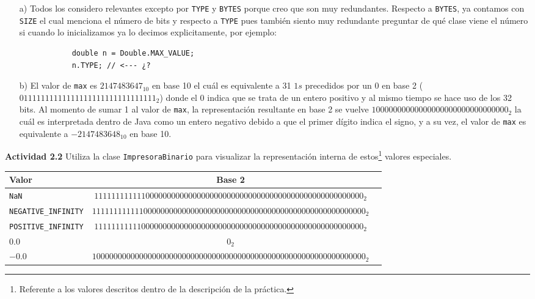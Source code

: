 \documentclass[11pt,letterpaper]{article}
\begin{document}
\begin{enumerate}
    \item[a)] Todos los considero relevantes excepto por \texttt{TYPE} y \texttt{BYTES}
    porque creo que son muy redundantes. Respecto a \texttt{BYTES}, ya contamos con
    \texttt{SIZE} el cual menciona el número de bits y respecto a \texttt{TYPE} pues
    también siento muy redundante preguntar de qué clase viene el número si cuando
    lo inicializamos ya lo decimos explicitamente, por ejemplo:
        \begin{verbatim}
            double n = Double.MAX_VALUE;
            n.TYPE; // <--- ¿?
        \end{verbatim}

    \item[b)] El valor de \texttt{max} es $2147483647_{10}$ en base 10 el cuál es equivalente
    a 31 $1s$ precedidos por un $0$ en base 2 ($01111111111111111111111111111111_2$)
    donde el $0$ indica que se trata de un entero positivo y al mismo tiempo se hace uso
    de los 32 bits. Al momento de sumar 1 al valor de \texttt{max}, la representación
    resultante en base 2 se vuelve $10000000000000000000000000000000_2$ la cuál es
    interpretada dentro de Java como un entero negativo debido a que el primer dígito
    indica el signo, y a su vez, el valor de \texttt{max} es equivalente a $-2147483648_{10}$
    en base 10.
\end{enumerate}

\textbf{Actividad 2.2} Utiliza la clase \texttt{ImpresoraBinario} para visualizar
la representación interna de estos\footnote{Referente a los valores descritos
dentro de la descripción de la práctica.} valores especiales.

    \begin{center}
        \begin{tabular}{ l | c c }
        Valor & Base 2 \\
        \hline
        \texttt{NaN} & $111111111111000000000000000000000000000000000000000000000000000_2$ \\
        \texttt{NEGATIVE\_INFINITY} & $1111111111110000000000000000000000000000000000000000000000000000_2$ \\
        \texttt{POSITIVE\_INFINITY} & $111111111110000000000000000000000000000000000000000000000000000_2$ \\
        \texttt{$0.0$} & $0_2$ \\
        \texttt{$-0.0$} & $1000000000000000000000000000000000000000000000000000000000000000_2$
        \end{tabular}
    \end{center}
\end{document}
